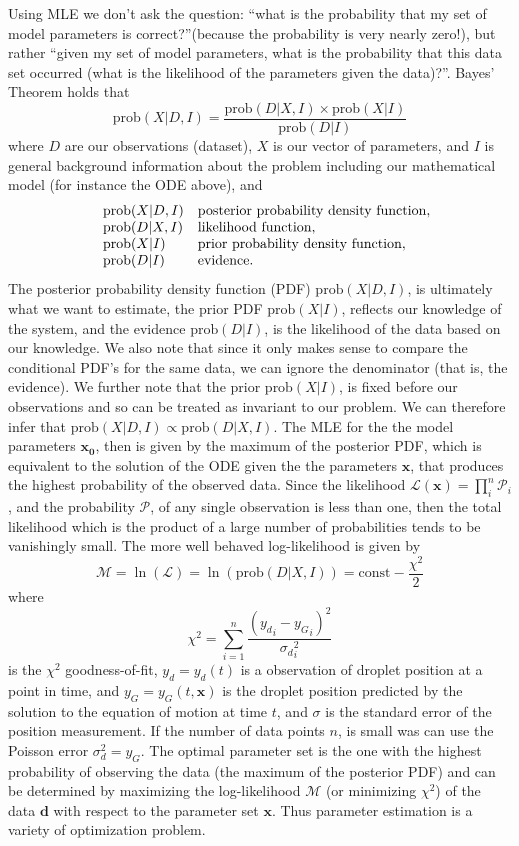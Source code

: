 \documentclass[10pt,a4paper]{article}
\begin{document}
Using MLE we don't ask the question: ``what is the probability that my set of model parameters is correct?''(because the probability is very nearly zero!), but rather ``given my set of model parameters, what is the probability that this data set occurred (what is the likelihood of the parameters given the data)?''. Bayes' Theorem holds that
\[\mbox{prob}(X|D, I) = \frac{\mbox{prob}(D|X,I) \times \mbox{prob}(X|I)}{\mbox{prob}(D|I)}\]
where $D$ are our observations (dataset), $X$ is our vector of parameters, and $I$ is general background information about the problem including our mathematical model (for instance the ODE above), and 
\[\begin{array}{lll}
& \centering \mbox{prob}(X|D, I) & \mbox{posterior probability density function},\\
& \centering \mbox{prob}(D|X, I) & \mbox{likelihood function},\\
& \centering \mbox{prob}(X|I) &  \mbox{prior probability density function},\\
& \centering \mbox{prob}(D|I) &  \mbox{evidence}.
\end{array}
\]
The posterior probability density function (PDF) $\mbox{prob}(X|D, I)$, is ultimately what we want to estimate, the prior PDF $\mbox{prob}(X|I)$, reflects our knowledge of the system, and the evidence $\mbox{prob}(D|I)$, is the likelihood of the data based on our knowledge. We also note that since it only makes sense to compare the conditional PDF's for the same data, we can ignore the denominator (that is, the evidence). We further note that the prior $\mbox{prob}(X|I)$, is fixed before our observations and so can be
treated as invariant to our problem. We can therefore infer that $\mbox{prob}(X|D, I) \propto \mbox{prob}(D|X, I)$. The MLE for the the model parameters $\mathbf{x_0}$, then is given by the maximum of the posterior PDF, which is equivalent to the solution of the ODE given the the parameters $\mathbf{x}$, that produces the highest probability of the observed data. Since the likelihood $\mathcal{L}(\mathbf{x}) = \prod_i^n \mathcal{P}_i$, and the probability $\mathcal{P}$, of any single observation is less than one, then the total likelihood which is the product of a large number of probabilities tends to be vanishingly small. The more well behaved log-likelihood is given by
\[\mathcal{M} = \ln(\mathcal{L}) = \ln(\mbox{prob}(D|X, I)) = \mbox{const} - \frac{\chi^2}{2}\]
where 
\[
\chi^2 = \sum^n_{i=1} \frac{\left({y_d}_i - {y_G}_i \right)^2}{{\sigma_d}_i^2}
\]
is the $\chi^2$ goodness-of-fit, $y_d = y_d(t)$ is a observation of droplet position at a point in time, and $y_G =  y_G(t, \mathbf{x})$ is the droplet position predicted by the solution to the equation of motion at time $t$, and $\sigma$ is the standard error of the position measurement. If the number of data points $n$, is small was can use the Poisson error $\sigma_d^2 = {y_G}$. The optimal parameter set is the one with the highest probability of observing the data (the maximum of the posterior PDF) and can be determined by maximizing the log-likelihood $\mathcal{M}$ (or minimizing $\chi^2$) of the data $\mathbf{d}$ with respect to the parameter set $\mathbf{x}$. Thus parameter estimation is a variety of optimization problem.
\end{document}
